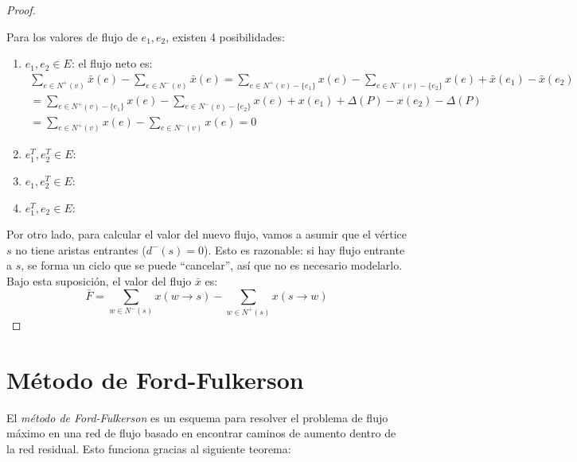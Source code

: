 \documentclass[a4paper]{report}
\begin{document}
\begin{proof}
\begin{itemize}
              Para los valores de flujo de $e_1, e_2$, existen 4 posibilidades:
              \begin{enumerate}
                  \item $e_1, e_2 \in E$: el flujo neto es:
                        \begin{align*}
                            \sum_{e \in N^+(v)} \bar{x}(e) - \sum_{e \in N^-(v)} \bar{x}(e) = \sum_{e \in N^+(v) - \{e_1\}} x(e) - \sum_{e \in N^-(v) - \{e_2\}} x(e) + \bar{x}(e_1) - \bar{x}(e_2) \\
                            = \sum_{e \in N^+(v) - \{e_1\}} x(e) - \sum_{e \in N^-(v) - \{e_2\}} x(e) + x(e_1) + \Delta(P) - x(e_2) - \Delta(P)                                                     \\
                            = \sum_{e \in N^+(v)} x(e) - \sum_{e \in N^-(v)} x(e) = 0
                        \end{align*}
                  \item $e_1^T, e_2^T \in E$:
                  \item $e_1, e_2^T \in E$:
                  \item $e_1^T, e_2 \in E$:
              \end{enumerate}
    \end{itemize}

    Por otro lado, para calcular el valor del nuevo flujo, vamos a asumir que el vértice $s$ no tiene aristas entrantes ($d^-(s) = 0$). Esto es razonable: si hay flujo entrante a $s$, se forma un ciclo que se puede ``cancelar'', así que no es necesario modelarlo. Bajo esta suposición, el valor del flujo $\bar{x}$ es:
    $$\bar{F} = \sum_{w \in N^-(s)} x(w \rightarrow s) - \sum_{w \in N^+(s)} x(s \rightarrow w)$$
\end{proof}

\section{Método de Ford-Fulkerson}

El \textit{método de Ford-Fulkerson} es un esquema para resolver el problema de flujo máximo en una red de flujo basado en encontrar caminos de aumento dentro de la red residual. Esto funciona gracias al siguiente teorema:
\end{document}
